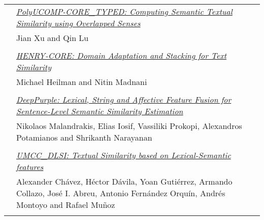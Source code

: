 \begin{tabular}{p{20mm}p{138mm}}
 & \hyperlink{page.90}{\em PolyUCOMP-CORE\_TYPED: Computing Semantic Textual Similarity using Overlapped Senses}\\
         & Jian Xu and Qin Lu \\
\\

 & \hyperlink{page.96}{\em HENRY-CORE: Domain Adaptation and Stacking for Text Similarity}\\
         & Michael Heilman and Nitin Madnani \\
\\

 & \hyperlink{page.103}{\em DeepPurple: Lexical, String and Affective Feature Fusion for Sentence-Level Semantic Similarity Estimation}\\
         & Nikolaos Malandrakis, Elias Iosif, Vassiliki Prokopi, Alexandros Potamianos and Shrikanth Narayanan \\
\\

 & \hyperlink{page.109}{\em UMCC\_DLSI: Textual Similarity based on Lexical-Semantic features}\\
         & Alexander Ch\'{a}vez, H\'{e}ctor D\'{a}vila, Yoan Guti\'{e}rrez, Armando Collazo, Jos\'{e} I. Abreu, Antonio Fern\'{a}ndez Orqu\'{i}n, Andr\'{e}s Montoyo and Rafael Mu\~{n}oz \\
\\

\end{tabular}
\newpage

